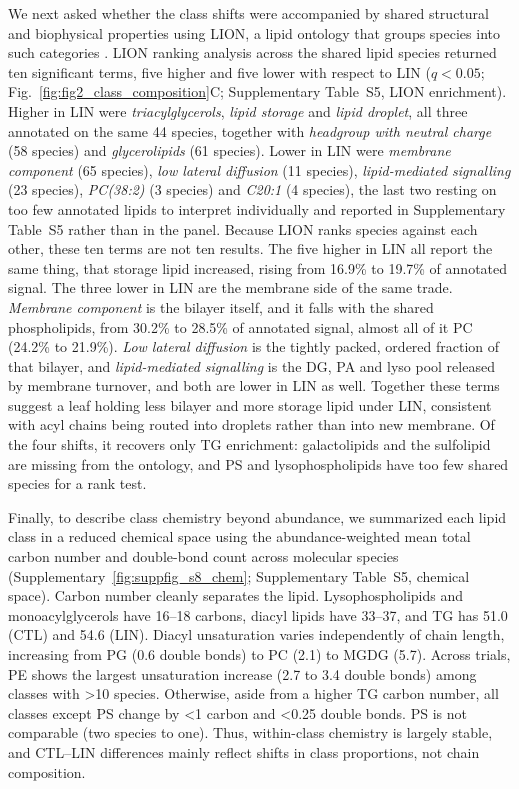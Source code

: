 \documentclass[9pt,twocolumn,twoside]{rilabRxiv}
\begin{document}
We next asked whether the class shifts were accompanied by shared structural and biophysical properties using LION, a lipid ontology that groups species into such categories \citep{Molenaar2019}. LION ranking analysis across the shared lipid species returned ten significant terms, five higher and five lower with respect to LIN (\(q<0.05\); Fig.~\ref{fig:fig2_class_composition}C; Supplementary Table~S5, LION enrichment). Higher in LIN were \textit{triacylglycerols}, \textit{lipid storage} and \textit{lipid droplet}, all three annotated on the same 44 species, together with \textit{headgroup with neutral charge} (58 species) and \textit{glycerolipids} (61 species). Lower in LIN were \textit{membrane component} (65 species), \textit{low lateral diffusion} (11 species), \textit{lipid-mediated signalling} (23 species), \textit{PC(38:2)} (3 species) and \textit{C20:1} (4 species), the last two resting on too few annotated lipids to interpret individually and reported in Supplementary Table~S5 rather than in the panel. Because LION ranks species against each other, these ten terms are not ten results. The five higher in LIN all report the same thing, that storage lipid increased, rising from 16.9\% to 19.7\% of annotated signal. The three lower in LIN are the membrane side of the same trade. \textit{Membrane component} is the bilayer itself, and it falls with the shared phospholipids, from 30.2\% to 28.5\% of annotated signal, almost all of it PC (24.2\% to 21.9\%). \textit{Low lateral diffusion} is the tightly packed, ordered fraction of that bilayer, and \textit{lipid-mediated signalling} is the DG, PA and lyso pool released by membrane turnover, and both are lower in LIN as well. Together these terms suggest a leaf holding less bilayer and more storage lipid under LIN, consistent with acyl chains being routed into droplets rather than into new membrane. Of the four shifts, it recovers only TG enrichment: galactolipids and the sulfolipid are missing from the ontology, and PS and lysophospholipids have too few shared species for a rank test.

Finally, to describe class chemistry beyond abundance, we summarized each lipid class in a reduced chemical space using the abundance-weighted mean total carbon number and double-bond count across molecular species (Supplementary~\ref{fig:suppfig_s8_chem}; Supplementary Table~S5, chemical space). Carbon number cleanly separates the lipid. Lysophospholipids and monoacylglycerols have 16–18 carbons, diacyl lipids have 33–37, and TG has 51.0 (CTL) and 54.6 (LIN). Diacyl unsaturation varies independently of chain length, increasing from PG (0.6 double bonds) to PC (2.1) to MGDG (5.7). Across trials, PE shows the largest unsaturation increase (2.7 to 3.4 double bonds) among classes with >10 species. Otherwise, aside from a higher TG carbon number, all classes except PS change by <1 carbon and <0.25 double bonds. PS is not comparable (two species to one). Thus, within-class chemistry is largely stable, and CTL–LIN differences mainly reflect shifts in class proportions, not chain composition.
\end{document}
